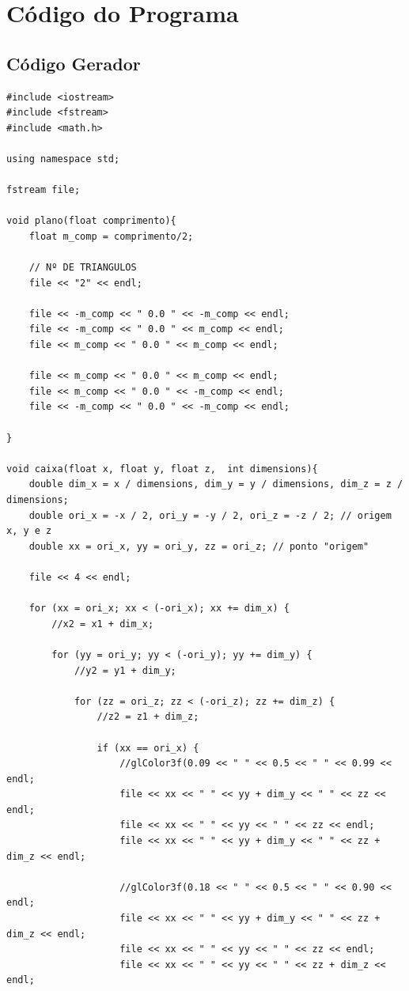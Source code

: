 \documentclass{report}
\begin{document}
\chapter{C\'odigo do Programa}
\section{C\'odigo Gerador}
\begin{lstlisting}
#include <iostream>
#include <fstream>
#include <math.h>

using namespace std;

fstream file;

void plano(float comprimento){
    float m_comp = comprimento/2;

    // Nº DE TRIANGULOS
    file << "2" << endl;

    file << -m_comp << " 0.0 " << -m_comp << endl;
    file << -m_comp << " 0.0 " << m_comp << endl;
    file << m_comp << " 0.0 " << m_comp << endl;

    file << m_comp << " 0.0 " << m_comp << endl;
    file << m_comp << " 0.0 " << -m_comp << endl;
    file << -m_comp << " 0.0 " << -m_comp << endl;

}

void caixa(float x, float y, float z,  int dimensions){
    double dim_x = x / dimensions, dim_y = y / dimensions, dim_z = z / dimensions;
    double ori_x = -x / 2, ori_y = -y / 2, ori_z = -z / 2; // origem x, y e z
    double xx = ori_x, yy = ori_y, zz = ori_z; // ponto "origem"

    file << 4 << endl;

    for (xx = ori_x; xx < (-ori_x); xx += dim_x) {
        //x2 = x1 + dim_x;

        for (yy = ori_y; yy < (-ori_y); yy += dim_y) {
            //y2 = y1 + dim_y;

            for (zz = ori_z; zz < (-ori_z); zz += dim_z) {
                //z2 = z1 + dim_z;

                if (xx == ori_x) {
                    //glColor3f(0.09 << " " << 0.5 << " " << 0.99 << endl;
                    file << xx << " " << yy + dim_y << " " << zz << endl;
                    file << xx << " " << yy << " " << zz << endl;
                    file << xx << " " << yy + dim_y << " " << zz + dim_z << endl;

                    //glColor3f(0.18 << " " << 0.5 << " " << 0.90 << endl;
                    file << xx << " " << yy + dim_y << " " << zz + dim_z << endl;
                    file << xx << " " << yy << " " << zz << endl;
                    file << xx << " " << yy << " " << zz + dim_z << endl;


\end{lstlisting}
\end{document}
